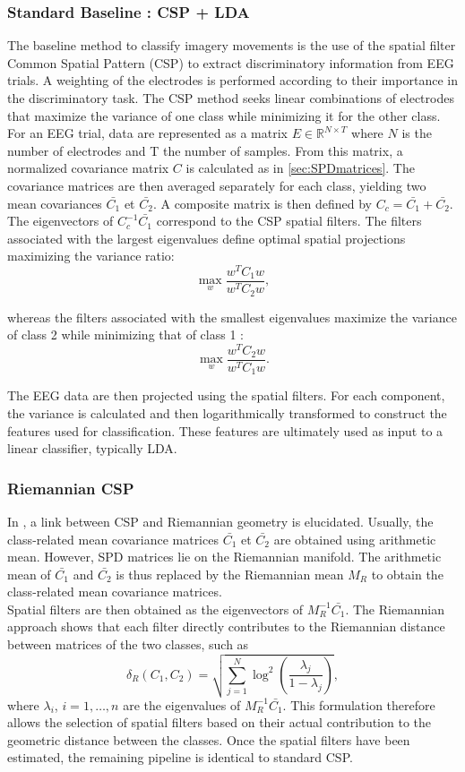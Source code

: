 \documentclass[11pt,a4paper]{article}
\begin{document}
\subsubsection{Standard Baseline : CSP + LDA} 
The baseline method to classify imagery movements is the use of the spatial filter Common Spatial Pattern (CSP) \cite{Ramoser2000} to extract discriminatory information from EEG trials. A weighting of the electrodes is performed according to their importance in the discriminatory task.
The CSP method seeks linear combinations of electrodes that maximize the variance of one class while minimizing it for the other class. For an EEG trial, data are represented as a matrix $E \in \mathbb{R}^{N \times T} $ where $N$ is the number of electrodes and T the number of samples. From this matrix, a normalized covariance matrix $C$ is calculated as in \ref{sec:SPDmatrices}. 
The covariance matrices are then averaged separately for each class, yielding two mean covariances $\bar{C_1}$ et $\bar{C_2}$. A composite matrix is then defined by $C_c = \bar{C_1} + \bar{C_2} $. The eigenvectors of $C_c^{-1}\bar{C_1}$ correspond to the CSP spatial filters. The filters associated with the largest eigenvalues define optimal spatial projections maximizing the variance ratio:
\[
\max_w \frac{w^T C_1 w}{w^T C_2 w}
,\]

\noindent whereas the filters associated with the smallest eigenvalues maximize the variance of class 2 while minimizing that of class 1 : \[ \max_w \frac{w^T C_2 w}{w^T C_1 w}.\]

\noindent The EEG data are then projected using the spatial filters. For each component, the variance is calculated and then logarithmically transformed to construct the features used for classification. These features are ultimately used as input to a linear classifier, typically LDA. 


\subsubsection{Riemannian CSP}
In \cite{RCSP}, a link between CSP and Riemannian geometry is elucidated. Usually, the class-related mean covariance matrices  $\bar{C_1}$ et $\bar{C_2}$ are obtained using arithmetic mean. However, SPD matrices lie on the Riemannian manifold. The arithmetic mean of $\bar{C_1}$ and $\bar{C_2}$ is thus replaced by the Riemannian mean $M_R$ to obtain the class-related mean covariance matrices. \\
Spatial filters are then obtained as the eigenvectors of $M_R^{-1}\bar{C_1}$.
The Riemannian approach shows that each filter directly contributes to the Riemannian distance between matrices of the two classes, such as \[ \delta_R(C_1, C_2) = \sqrt{\sum_{j=1}^N \log^2(\frac{\lambda_j}{1-\lambda_j})},\] where $\lambda_i$, $i=1, \dots,n$ are the eigenvalues of $M_R^{-1}\bar{C_1}$.
This formulation therefore allows the selection of spatial filters based on their actual contribution to the geometric distance between the classes.
Once the spatial filters have been estimated, the remaining pipeline is identical to standard CSP. 
\end{document}
